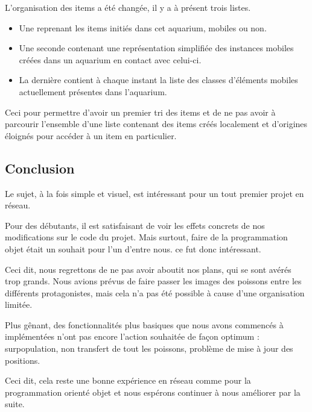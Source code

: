 \documentclass[a4paper, 12pt]{report}
\begin{document}
\begin{spacing}{1.3}
L'organisation des items a été changée, il y a à présent trois listes.
\begin{itemize}
\item Une reprenant les items initiés dans cet aquarium, mobiles ou non.
\item Une seconde contenant une représentation simplifiée des instances mobiles créées dans un aquarium en contact avec celui-ci.
\item La dernière contient à chaque instant la liste des classes d'éléments mobiles actuellement présentes dans l'aquarium.
\end{itemize}
	
Ceci pour permettre d'avoir un premier tri des items et de ne pas avoir à parcourir l'ensemble d'une liste contenant des items créés localement et d'origines éloignés pour accéder à un item en particulier.

\newpage

\textcolor{colortitre1}{\section*{Conclusion}}

Le sujet, à la fois simple et visuel, est intéressant pour un tout premier projet en réseau.

Pour des débutants, il est satisfaisant de voir les effets concrets de nos modifications sur le code du projet. Mais surtout, faire de la programmation objet était un souhait pour l'un d'entre nous. ce fut donc intéressant.

Ceci dit, nous regrettons de ne pas avoir aboutit nos plans, qui se sont avérés trop grands. Nous avions prévus de faire passer les images des poissons entre les différents protagonistes, mais cela n'a pas été possible à cause d'une organisation limitée.

Plus gênant, des fonctionnalités plus basiques que nous avons commencés à implémentées n'ont pas encore l'action souhaitée de façon optimum : surpopulation, non transfert de tout les poissons, problème de mise à jour des positions.

Ceci dit, cela reste une bonne expérience en réseau comme pour la programmation orienté objet et nous espérons continuer à nous améliorer par la suite.

\end{spacing}
\end{document}
